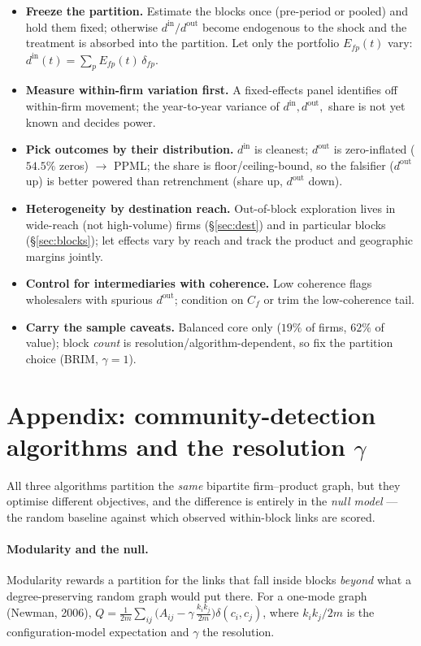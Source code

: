 \documentclass[11pt]{article}
\newcommand{\din}{d^{\mathrm{in}}}
\newcommand{\dout}{d^{\mathrm{out}}}
\begin{document}
\begin{itemize}
  \item \textbf{Freeze the partition.} Estimate the blocks once (pre-period or pooled) and hold them fixed;
        otherwise $\din/\dout$ become endogenous to the shock and the treatment is absorbed into the partition.
        Let only the portfolio $E_{fp}(t)$ vary: $\din(t)=\sum_p E_{fp}(t)\,\delta_{fp}$.
  \item \textbf{Measure within-firm variation first.} A fixed-effects panel identifies off within-firm
        movement; the year-to-year variance of $\din,\dout,$ share is not yet known and decides power.
  \item \textbf{Pick outcomes by their distribution.} $\din$ is cleanest; $\dout$ is zero-inflated
        ($54.5\%$ zeros) $\to$ PPML; the share is floor/ceiling-bound, so the falsifier ($\dout$ up) is better
        powered than retrenchment (share up, $\dout$ down).
  \item \textbf{Heterogeneity by destination reach.} Out-of-block exploration lives in wide-reach (not
        high-volume) firms (\S\ref{sec:dest}) and in particular blocks (\S\ref{sec:blocks}); let effects vary by
        reach and track the product and geographic margins jointly.
  \item \textbf{Control for intermediaries with coherence.} Low coherence flags wholesalers with spurious
        $\dout$; condition on $C_f$ or trim the low-coherence tail.
  \item \textbf{Carry the sample caveats.} Balanced core only ($19\%$ of firms, $62\%$ of value); block
        \emph{count} is resolution/algorithm-dependent, so fix the partition choice (BRIM, $\gamma=1$).
\end{itemize}

\section*{Appendix: community-detection algorithms and the resolution $\gamma$}
\label{app:algos}
\small

All three algorithms partition the \emph{same} bipartite firm--product graph, but they optimise different
objectives, and the difference is entirely in the \emph{null model} --- the random baseline against which
observed within-block links are scored.

\paragraph{Modularity and the null.} Modularity rewards a partition for the links that fall inside blocks
\emph{beyond} what a degree-preserving random graph would put there. For a one-mode graph (Newman, 2006),
$Q=\frac{1}{2m}\sum_{ij}\big(A_{ij}-\gamma\,\tfrac{k_ik_j}{2m}\big)\delta(c_i,c_j)$, where $k_ik_j/2m$ is the
configuration-model expectation and $\gamma$ the resolution.
\end{document}
